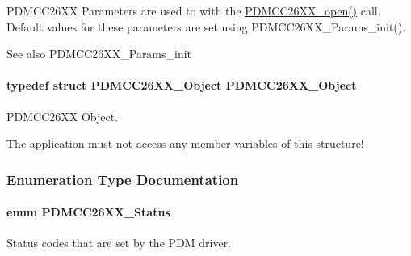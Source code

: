 P\+D\+M\+C\+C26\+X\+X Parameters are used to with the \hyperlink{_p_d_m_c_c26_x_x_8h_a431d9b71e0d0eebd5ab85960f1c82ee0}{P\+D\+M\+C\+C26\+X\+X\+\_\+open()} call. Default values for these parameters are set using P\+D\+M\+C\+C26\+X\+X\+\_\+\+Params\+\_\+init(). 

\begin{DoxySeeAlso}{See also}
P\+D\+M\+C\+C26\+X\+X\+\_\+\+Params\+\_\+init 
\end{DoxySeeAlso}
\paragraph[{P\+D\+M\+C\+C26\+X\+X\+\_\+\+Object}]{\setlength{\rightskip}{0pt plus 5cm}typedef struct {\bf P\+D\+M\+C\+C26\+X\+X\+\_\+\+Object}  {\bf P\+D\+M\+C\+C26\+X\+X\+\_\+\+Object}}\label{_p_d_m_c_c26_x_x_8h_a8faebd80770af564015834b59c2d3414}


P\+D\+M\+C\+C26\+X\+X Object. 

The application must not access any member variables of this structure! 

\subsubsection{Enumeration Type Documentation}
\paragraph[{P\+D\+M\+C\+C26\+X\+X\+\_\+\+Status}]{\setlength{\rightskip}{0pt plus 5cm}enum {\bf P\+D\+M\+C\+C26\+X\+X\+\_\+\+Status}}\label{_p_d_m_c_c26_x_x_8h_afbfe993e790be75708df00186070a779}


Status codes that are set by the P\+D\+M driver. 

